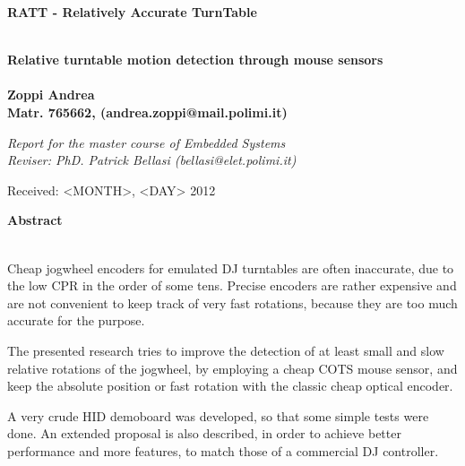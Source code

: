 \documentclass[a4paper,10pt]{article}
\newenvironment*{mytitle}{\begin{LARGE}\bf}{\end{LARGE}\\}%
\newenvironment*{mysubtitle}{\bf}{\\[1.5ex]}%
\newenvironment*{myabstract}{\begin{Large}\bf}{\end{Large}\\[2.5ex]}%
\begin{document}
\newcommand{\ttDiscDiam}{12.00}
\newcommand{\ttNomAngSpeed}{33.00}
\newcommand{\ttPitchOff}{0.00}
\newcommand{\ttDiscPerim}{37.70}
\newcommand{\ttAngSpeed}{33.00}
\newcommand{\ttRevRate}{0.550}
\newcommand{\ttRevTime}{1.818}
\newcommand{\ttTgSpeed}{20.73}
		
\newcommand{\ssRes}{2000}
\newcommand{\ssMaxSpeed}{30}
\newcommand{\ssMaxDotRate}{60000}
\newcommand{\ssMaxDotsOneMs}{60}
		
\newcommand{\mmRadius}{4.00}
\newcommand{\mmAngleOff}{0.00}
\newcommand{\mmRadiusCm}{10.16}
\newcommand{\mmSpeed}{13.82}
\newcommand{\mmDotRate}{27646}
\newcommand{\mmRevDots}{50265}



\begin{mytitle}RATT	- Relatively Accurate TurnTable\end{mytitle}
\begin{mysubtitle}Relative turntable motion detection through mouse sensors\end{mysubtitle}
\\
Zoppi Andrea\\
Matr. 765662, (andrea.zoppi@mail.polimi.it)\\
\begin{flushright}
\emph{Report for the master course of Embedded Systems}\\
\emph{Reviser: PhD. Patrick Bellasi (bellasi@elet.polimi.it)}
\end{flushright}

Received: <MONTH>, <DAY> 2012\\
\hspace{10ex}

\begin{myabstract} Abstract \end{myabstract}
Cheap jogwheel encoders for emulated DJ turntables are often inaccurate, due
to the low CPR in the order of some tens. Precise encoders are rather expensive
and are not convenient to keep track of very fast rotations, because they
are too much accurate for the purpose.

The presented research tries to improve the detection of at least small and
slow relative rotations of the jogwheel, by employing a cheap COTS mouse sensor,
and keep the absolute position or fast rotation with the classic cheap optical
encoder.

A very crude HID demoboard was developed, so that some simple tests were done.
An extended proposal is also described, in order to achieve better performance
and more features, to match those of a commercial DJ controller.
\end{document}
